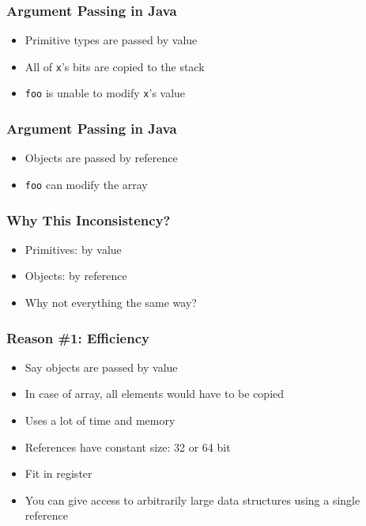 \begin{frame}
  \frametitle{Argument Passing in Java}
  \begin{itemize}
    \item Primitive types are passed by value
    \item All of \texttt{x}'s bits are copied to the stack
    \item \texttt{foo} is unable to modify \texttt{x}'s value
  \end{itemize}
\end{frame}

\begin{frame}
  \frametitle{Argument Passing in Java}
  \begin{itemize}
    \item Objects are passed by reference
    \item \texttt{foo} can modify the array
  \end{itemize}
\end{frame}

\begin{frame}
  \frametitle{Why This Inconsistency?}
  \begin{itemize}
    \item Primitives: by value
    \item Objects: by reference
    \item Why not everything the same way?
  \end{itemize}
\end{frame}

\begin{frame}
  \frametitle{Reason \#1: Efficiency}
  \begin{itemize}
    \item Say objects are passed by value
    \item In case of array, all elements would have to be copied
    \item Uses a lot of time and memory
    \item References have constant size: 32 or 64 bit
    \item Fit in register
    \item You can give access to arbitrarily large data structures using a single reference
  \end{itemize}
\end{frame}

